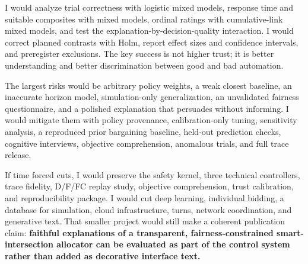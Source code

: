 \documentclass[
  english,
  11pt,
  a4paper,
]{article}
\begin{document}
I would analyze trial correctness with logistic mixed models, response
time and suitable composites with mixed models, ordinal ratings with
cumulative-link mixed models, and test the
explanation-by-decision-quality interaction. I would correct planned
contrasts with Holm, report effect sizes and confidence intervals, and
preregister exclusions. The key success is not higher trust; it is
better understanding and better discrimination between good and bad
automation.

The largest risks would be arbitrary policy weights, a weak closest
baseline, an inaccurate horizon model, simulation-only generalization,
an unvalidated fairness questionnaire, and a polished explanation that
persuades without informing. I would mitigate them with policy
provenance, calibration-only tuning, sensitivity analysis, a reproduced
prior bargaining baseline, held-out prediction checks, cognitive
interviews, objective comprehension, anomalous trials, and full trace
release.

If time forced cuts, I would preserve the safety kernel, three technical
controllers, trace fidelity, D/F/FC replay study, objective
comprehension, trust calibration, and reproducibility package. I would
cut deep learning, individual bidding, a database for simulation, cloud
infrastructure, turns, network coordination, and generative text. That
smaller project would still make a coherent publication claim:
\textbf{faithful explanations of a transparent, fairness-constrained
smart-intersection allocator can be evaluated as part of the control
system rather than added as decorative interface text.}
\end{document}
